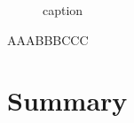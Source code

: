 \begin{figure}[!htb]
  \centering

  \hfill
  \caption{caption}\label{fig:fig3}
\end{figure}

\begin{mdframed}
AAABBBCCC
\end{mdframed}

\section{Summary}
\label{ch2:sec:Summary}